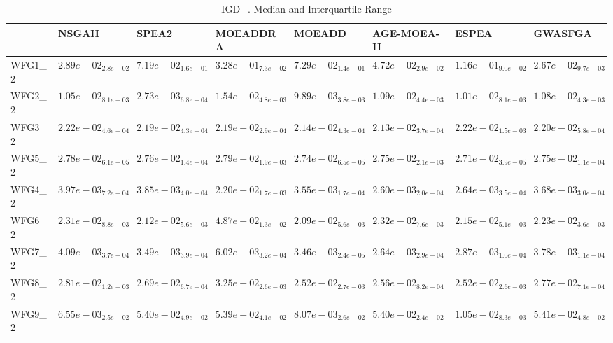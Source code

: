 \documentclass{article}
\begin{document}
\begin{table}
\caption{IGD+. Median and Interquartile Range}
\label{table: IGD+}
\centering
\begin{scriptsize}
\begin{tabular}{llllllll}
\hline & NSGAII & SPEA2 & MOEADDRA & MOEADD & AGE-MOEA-II & ESPEA &  GWASFGA\\
\hline 
WFG1\_2 & \cellcolor{gray25}$  2.89e-02_{ 2.8e-02}$ & $  7.19e-02_{ 1.6e-01}$ & $  3.28e-01_{ 7.3e-02}$ & $  7.29e-02_{ 1.4e-01}$ & $  4.72e-02_{ 2.9e-02}$ & $  1.16e-01_{ 9.0e-02}$ & \cellcolor{gray95}$  2.67e-02_{ 9.7e-03}$ \\
WFG2\_2 & $  1.05e-02_{ 8.1e-03}$ & \cellcolor{gray95}$  2.73e-03_{ 6.8e-04}$ & $  1.54e-02_{ 4.8e-03}$ & \cellcolor{gray25}$  9.89e-03_{ 3.8e-03}$ & $  1.09e-02_{ 4.4e-03}$ & $  1.01e-02_{ 8.1e-03}$ & $  1.08e-02_{ 4.3e-03}$ \\
WFG3\_2 & $  2.22e-02_{ 4.6e-04}$ & $  2.19e-02_{ 4.3e-04}$ & $  2.19e-02_{ 2.9e-04}$ & \cellcolor{gray25}$  2.14e-02_{ 4.3e-04}$ & \cellcolor{gray95}$  2.13e-02_{ 3.7e-04}$ & $  2.22e-02_{ 1.5e-03}$ & $  2.20e-02_{ 5.8e-04}$ \\
WFG5\_2 & $  2.78e-02_{ 6.1e-05}$ & $  2.76e-02_{ 1.4e-04}$ & $  2.79e-02_{ 1.9e-03}$ & \cellcolor{gray25}$  2.74e-02_{ 6.5e-05}$ & $  2.75e-02_{ 2.1e-03}$ & \cellcolor{gray95}$  2.71e-02_{ 3.9e-05}$ & $  2.75e-02_{ 1.1e-04}$ \\
WFG4\_2 & $  3.97e-03_{ 7.2e-04}$ & $  3.85e-03_{ 4.0e-04}$ & $  2.20e-02_{ 1.7e-03}$ & $  3.55e-03_{ 1.7e-04}$ & \cellcolor{gray95}$  2.60e-03_{ 2.0e-04}$ & \cellcolor{gray25}$  2.64e-03_{ 3.5e-04}$ & $  3.68e-03_{ 3.0e-04}$ \\
WFG6\_2 & $  2.31e-02_{ 8.8e-03}$ & \cellcolor{gray25}$  2.12e-02_{ 5.6e-03}$ & $  4.87e-02_{ 1.3e-02}$ & \cellcolor{gray95}$  2.09e-02_{ 5.6e-03}$ & $  2.32e-02_{ 7.6e-03}$ & $  2.15e-02_{ 5.1e-03}$ & $  2.23e-02_{ 3.6e-03}$ \\
WFG7\_2 & $  4.09e-03_{ 3.7e-04}$ & $  3.49e-03_{ 3.9e-04}$ & $  6.02e-03_{ 3.2e-04}$ & $  3.46e-03_{ 2.4e-05}$ & \cellcolor{gray95}$  2.64e-03_{ 2.9e-04}$ & \cellcolor{gray25}$  2.87e-03_{ 1.0e-04}$ & $  3.78e-03_{ 1.1e-04}$ \\
WFG8\_2 & $  2.81e-02_{ 1.2e-03}$ & $  2.69e-02_{ 6.7e-04}$ & $  3.25e-02_{ 2.6e-03}$ & \cellcolor{gray95}$  2.52e-02_{ 2.7e-03}$ & $  2.56e-02_{ 8.2e-04}$ & \cellcolor{gray25}$  2.52e-02_{ 2.6e-03}$ & $  2.77e-02_{ 7.1e-04}$ \\
WFG9\_2 & \cellcolor{gray95}$  6.55e-03_{ 2.5e-02}$ & $  5.40e-02_{ 4.9e-02}$ & $  5.39e-02_{ 4.1e-02}$ & \cellcolor{gray25}$  8.07e-03_{ 2.6e-02}$ & $  5.40e-02_{ 2.4e-02}$ & $  1.05e-02_{ 8.3e-03}$ & $  5.41e-02_{ 4.8e-02}$ \\

\end{tabular}
\end{scriptsize}
\end{table}
\end{document}

